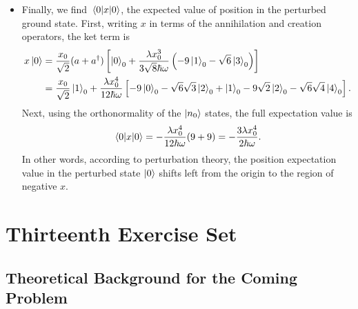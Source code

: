 \documentclass[11pt, a4paper]{article}
\begin{document}
\begin{itemize}
	\item Finally, we find $ \mel{0}{x}{0} $, the expected value of position in the perturbed ground state. First, writing $ x $ in terms of the annihilation and creation operators, the ket term is
	\begin{align*}
		x\ket{0} &= \frac{x_{0}}{\sqrt{2}}(a + a^{\dagger})\left[ \ket{0}_{0} + \frac{\lambda x_{0}^{3}}{3\sqrt{8}\hbar\omega}\left(-9\ket{1}_{0} - \sqrt{6}\ket{3}_{0}\right)\right]\\
		&= \frac{x_{0}}{\sqrt{2}}\ket{1}_{0} + \frac{\lambda x_{0}^{4}}{12\hbar \omega} \left[-9 \ket{0}_{0} - \sqrt{6} \sqrt{3}\ket{2}_{0} + \ket{1}_{0} - 9 \sqrt{2}\ket{2}_{0} - \sqrt{6}\sqrt{4}\ket{4}_{0}\right].
	\end{align*}
	Next, using the orthonormality of the $ \ket{n_{0}} $ states, the full expectation value is
	\begin{equation*}
		\mel{0}{x}{0} = -\frac{\lambda x_{0}^{4}}{12 \hbar \omega}(9 + 9) = -\frac{3\lambda x_{0}^{4}}{2 \hbar \omega}.
	\end{equation*}
	In other words, according to perturbation theory, the position expectation value in the perturbed state $ \ket{0} $ shifts left from the origin to the region of negative $ x $. 
	

	
\end{itemize}

\section{Thirteenth Exercise Set}

\subsection{Theoretical Background for the Coming Problem}
\end{document}
